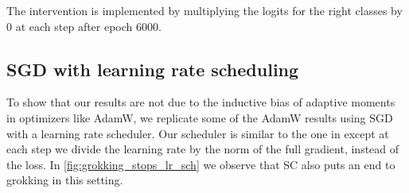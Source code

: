 The intervention is implemented by multiplying the logits for the right classes by 0 at each step after epoch 6000.

\subsection{SGD with learning rate scheduling}
To show that our results are not due to the inductive bias of adaptive moments in optimizers like AdamW, we replicate some of the AdamW results using SGD with a learning rate scheduler. Our scheduler is similar to the one in \cite{Lyu2019-sc} except at each step we divide the learning rate by the norm of the full gradient, instead of the loss. In \cref{fig:grokking_stops_lr_sch} we observe that SC also puts an end to grokking in this setting.
\vspace{5.75mm}\\

